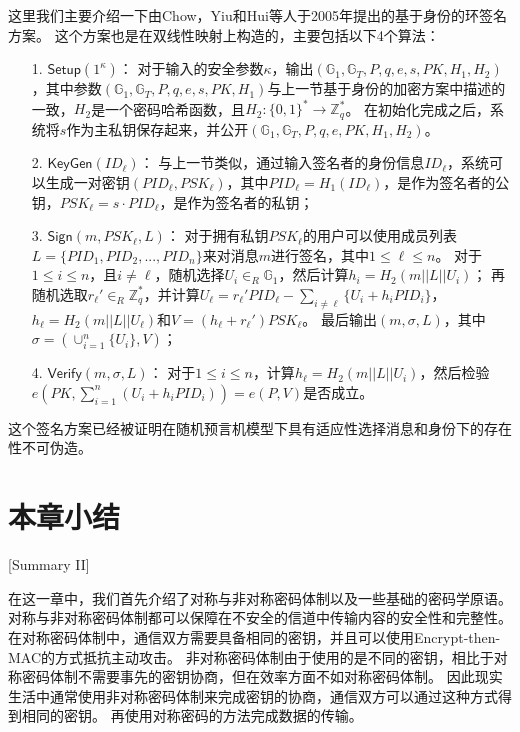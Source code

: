 这里我们主要介绍一下由Chow，Yiu和Hui等人于2005年提出的基于身份的环签名方案\cite{chow2005efficient}。
这个方案也是在双线性映射上构造的，主要包括以下4个算法：

\begin{itemize}
  \item[1.] $\mathsf{Setup}(1^\kappa)$： 对于输入的安全参数$\kappa$，输出$(\mathbb{G}_1,\mathbb{G}_T,P,q,e,s,PK,H_1,H_2)$，其中参数$(\mathbb{G}_1,\mathbb{G}_T,P,q,e,s,PK,H_1)$与上一节基于身份的加密方案中描述的一致，$H_2$是一个密码哈希函数，且$H_2:\{0,1\}^*\rightarrow\mathbb{Z}_q^*$。
  在初始化完成之后，系统将$s$作为主私钥保存起来，并公开$(\mathbb{G}_1,\mathbb{G}_T,P,q,e,PK,H_1,H_2)$。
  \item[2.] $\mathsf{KeyGen}(ID_\ell)$： 与上一节类似，通过输入签名者的身份信息$ID_\ell$，系统可以生成一对密钥$(PID_\ell,PSK_\ell)$，其中$PID_\ell=H_1(ID_\ell)$，是作为签名者的公钥，$PSK_\ell=s\cdot PID_\ell$，是作为签名者的私钥；
  \item[3.] $\mathsf{Sign}(m,PSK_\ell,L)$： 对于拥有私钥$PSK_\ell$的用户可以使用成员列表$L=\{PID_1,PID_2,...,PID_n\}$来对消息$m$进行签名，其中$1\leq \ell\leq n$。
  对于$1\leq i \leq n$，且$i\neq \ell$，随机选择$U_i\in_R\mathbb{G}_1$，然后计算$h_i=H_2(m||L||U_i)$；
  再随机选取$r_\ell'\in_R\mathbb{Z}_q^*$，并计算$U_\ell=r_\ell'PID_\ell-\sum_{i\neq \ell}\{U_i+h_i PID_i\}$，$h_\ell=H_2(m||L||U_\ell)$和$V=(h_\ell+r_\ell')PSK_\ell$。
  最后输出$(m,\sigma,L)$，其中$\sigma=(\cup_{i=1}^n\{U_i\},V)$；
  \item[4.] $\mathsf{Verify}(m,\sigma,L)$： 对于$1\leq i \leq n$，计算$h_\ell=H_2(m||L||U_i)$，然后检验$e(PK,\sum_{i=1}^n(U_i+h_iPID{_i}))=e(P,V)$是否成立。
\end{itemize}

这个签名方案已经被证明在随机预言机模型下具有适应性选择消息和身份下的存在性不可伪造\cite{chow2005efficient}。

\section{本章小结}[Summary II]

在这一章中，我们首先介绍了对称与非对称密码体制以及一些基础的密码学原语。
对称与非对称密码体制都可以保障在不安全的信道中传输内容的安全性和完整性。
在对称密码体制中，通信双方需要具备相同的密钥，并且可以使用Encrypt-then-MAC的方式抵抗主动攻击。
非对称密码体制由于使用的是不同的密钥，相比于对称密码体制不需要事先的密钥协商，但在效率方面不如对称密码体制。
因此现实生活中通常使用非对称密码体制来完成密钥的协商，通信双方可以通过这种方式得到相同的密钥。
再使用对称密码的方法完成数据的传输。

